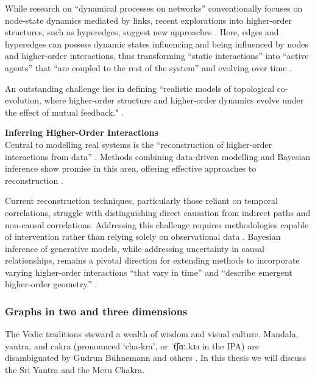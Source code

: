 While research on “dynamical processes on networks” conventionally focuses on node-state dynamics mediated by links, recent explorations into higher-order structures, such as hyperedges, suggest new approaches \citep[p. 2]{battiston_physics_2021}. Here, edges and hyperedges can possess dynamic states influencing and being influenced by nodes and higher-order interactions, thus transforming “static interactions” into “active agents” that “are coupled to the rest of the system” and evolving over time \citep[p. 2]{battiston_physics_2021}.

An outstanding challenge lies in defining ``realistic models of topological co-evolution, where higher-order structure and higher-order dynamics evolve under the effect of mutual feedback." \citep[p. 4]{battiston_physics_2021}.

\noindent \textbf{Inferring Higher-Order Interactions} \\
Central to modelling real systems is the ``reconstruction of higher-order interactions from data” \citep[p. 4-5]{battiston_physics_2021}. Methods combining data-driven modelling and Bayesian inference show promise in this area, offering effective approaches to reconstruction \citep[p. 4-5]{battiston_physics_2021}.

Current reconstruction techniques, particularly those reliant on temporal correlations, struggle with distinguishing direct causation from indirect paths and non-causal correlations. Addressing this challenge requires methodologies capable of intervention rather than relying solely on observational data \citep[p. 5]{battiston_physics_2021}. Bayesian inference of generative models, while addressing uncertainty in causal relationships, remains a pivotal direction for extending methods to incorporate varying higher-order interactions ``that vary in time” and ``describe emergent higher-order geometry” \citep[p. 5]{battiston_physics_2021}.

\subsubsection{Graphs in two and three dimensions}
The Vedic traditions steward a wealth of wisdom and visual culture. Mandala, yantra, and cakra (pronounced ‘cha-kra’, or ˈt͡ʃɑː.kɹə in the IPA) are disambiguated by Gudrun Bühnemann and others \citep[p. 13-56]{buhnemann_mandalas_2003}. In this thesis we will discuss the Sri Yantra and the Meru Chakra. 

